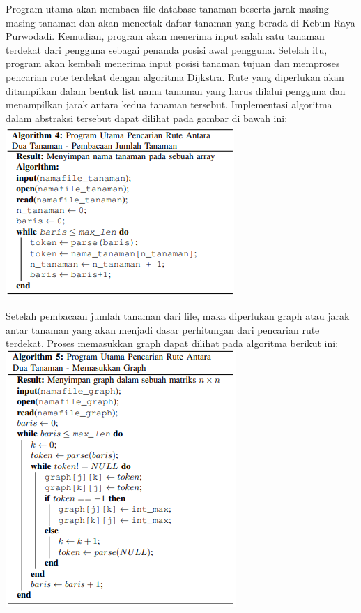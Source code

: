 \documentclass[conference]{IEEEtran}
\begin{document}
Program utama akan membaca file database tanaman
beserta jarak masing-masing tanaman dan akan mencetak
daftar tanaman yang berada di Kebun Raya Purwodadi.
Kemudian, program akan menerima input salah satu tanaman
terdekat dari pengguna sebagai penanda posisi awal pengguna.
Setelah itu, program akan kembali menerima input posisi
tanaman tujuan dan memproses pencarian rute terdekat dengan
algoritma Dijkstra. Rute yang diperlukan akan ditampilkan
dalam bentuk list nama tanaman yang harus dilalui pengguna
dan menampilkan jarak antara kedua tanaman tersebut.
Implementasi algoritma dalam abstraksi tersebut dapat dilihat
pada gambar di bawah ini:\vspace{0.5cm}
\includegraphics[scale=0.75]{tugas0526.jpg}\vspace{0.5cm}

Setelah pembacaan jumlah tanaman dari file, maka diperlukan graph atau jarak antar tanaman yang akan menjadi dasar
perhitungan dari pencarian rute terdekat. Proses memasukkan
graph dapat dilihat pada algoritma berikut ini:
\includegraphics[scale=0.75]{tugas0527.jpg}\vspace{0.5cm}
\end{document}
